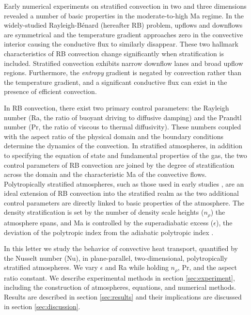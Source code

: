 \documentclass[aps, prl, twocolumn, nofootinbib, groupedaddress, amsfonts, amssymb, amsmath]{revtex4-1}
\newcommand{\RB}{Rayleigh-B\'{e}nard }
\newcommand{\nrho}{\ensuremath{n_{\rho}}}
\begin{document}
Early numerical experiments on stratified convection
in two \cite{graham1975, chan&all1982,
hurlburt&all1984, cattaneo&all1990} and three 
\cite{cattaneo&all1991, brummell&all1996} dimensions
revealed a number of basic properties in the moderate-to-high 
Ma regime. In the widely-studied \RB (hereafter RB) problem, 
upflows and downflows are symmetrical and
the temperature gradient approaches zero in the convective interior 
causing the conductive flux to similarly 
disappear.  These two hallmark characteristics of RB convection change
significantly when stratification is included.  Stratified convection 
exhibits narrow downflow lanes and broad upflow regions.
Furthermore, the \emph{entropy} gradient is negated by convection 
rather than the temperature gradient, and
a significant conductive flux can exist in the presence of
efficient convection.

In RB convection, there exist two primary control parameters: 
the Rayleigh number (Ra, the ratio of
buoyant driving to diffusive damping) and the Prandtl number 
(Pr, the ratio of viscous to thermal
diffusivity).  These numbers coupled with the aspect ratio of 
the physical domain and the boundary conditions
determine the dynamics of the convection.  In stratified atmospheres, 
in addition to specifying the equation of state and
fundamental properties of the gas, the two control parameters of 
RB convection are joined by the degree of
stratification across the domain and the characteristic 
Ma of the convective flows.  
Polytropically stratified atmospheres, such as those used in 
early studies \cite{graham1975, chan&all1982, hurlburt&all1984, 
cattaneo&all1990, cattaneo&all1991, brummell&all1996}, are an ideal extension of
RB convection into the stratified realm as the two additional 
control parameters are directly linked to
basic properties of the atmosphere.  The density stratification is 
set by the number of density scale heights (\nrho)
the atmosphere spans, and Ma is controlled 
by the superadiabatic excess ($\epsilon$),
the deviation of the polytropic index from the adiabatic polytropic 
index \cite{graham1975}.

In this letter we study the behavior of convective heat transport, 
quantified by the Nusselt number (Nu), in plane-parallel, 
two-dimensional, polytropically stratified atmospheres.  
We vary $\epsilon$ and Ra while holding $\nrho$, Pr, and the aspect ratio
constant.  We describe experimental methods in section 
\ref{sec:experiment}, including the construction of atmospheres, equations, and numerical methods.  
Results are described in section \ref{sec:results} and their implications are discussed
in section \ref{sec:discussion}.
\end{document}
